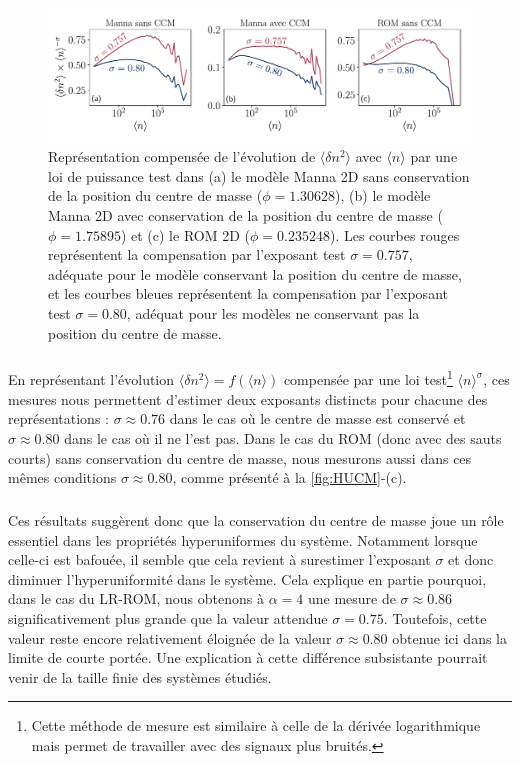 \begin{figure}[h]
	\centering
	\includegraphics[width=\textwidth]{Chapitre2/Figures/Hyperuniformity/ImportanceCMHU.pdf}
	\caption{Représentation compensée de l'évolution de $\langle \delta n^2 \rangle$ avec $\langle n \rangle$ par une loi de puissance test dans (a) le modèle Manna 2D sans conservation de la position du centre de masse ($\phi = 1.30628$), (b) le modèle Manna 2D avec conservation de la position du centre de masse ($\phi = 1.75895$) et (c) le ROM 2D ($\phi = 0.235248$). Les courbes rouges représentent la compensation par l'exposant test $\sigma = 0.757$, adéquate pour le modèle conservant la position du centre de masse, et les courbes bleues représentent la compensation par l'exposant test $\sigma = 0.80$, adéquat pour les modèles ne conservant pas la position du centre de masse.}
	\label{fig:HUCM}
\end{figure}

\subparagraph{}En représentant l'évolution $\langle \delta n^2 \rangle = f(\langle n \rangle)$ compensée par une loi test\footnote{Cette méthode de mesure est similaire à celle de la dérivée logarithmique mais permet de travailler avec des signaux plus bruités.} $\langle n \rangle^\sigma$, ces mesures nous permettent d'estimer deux exposants distincts pour chacune des représentations : $\sigma \approx 0.76$ dans le cas où le centre de masse est conservé et $\sigma\approx 0.80$ dans le cas où il ne l'est pas. Dans le cas du ROM (donc avec des sauts courts) sans conservation du centre de masse, nous mesurons aussi dans ces mêmes conditions $\sigma\approx 0.80$, comme présenté à la \autoref{fig:HUCM}-(c).

\subparagraph{}Ces résultats suggèrent donc que la conservation du centre de masse joue un rôle essentiel dans les propriétés hyperuniformes du système. Notamment lorsque celle-ci est bafouée, il semble que cela revient à surestimer l'exposant $\sigma$ et donc diminuer l'hyperuniformité dans le système. Cela explique en partie pourquoi, dans le cas du LR-ROM, nous obtenons à $\alpha = 4$ une mesure de $\sigma\approx 0.86$ significativement plus grande que la valeur attendue $\sigma= 0.75$. Toutefois, cette valeur reste encore relativement éloignée de la valeur $\sigma\approx 0.80$ obtenue ici dans la limite de courte portée. Une explication à cette différence subsistante pourrait venir de la taille finie des systèmes étudiés.

